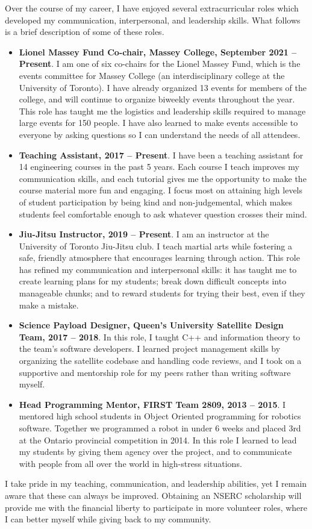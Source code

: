 \documentclass[a4paper,12pt]{article}
\begin{document}
Over the course of my career, I have enjoyed several extracurricular roles which
developed my communication, interpersonal, and leadership skills.
What follows is a brief description of some of these roles.
\begin{itemize}
\item \textbf{Lionel Massey Fund Co-chair, Massey College, September 2021 -- Present}.
    I am one of six co-chairs for the Lionel Massey Fund, which is the events
    committee for Massey College (an interdisciplinary college at the University
    of Toronto).
    I have already organized 13 events for members of the college, and will
    continue to organize biweekly events throughout the year.
    This role has taught me the logistics and leadership skills required to
    manage large events for 150 people.
    I have also learned to make events accessible to everyone by asking
    questions so I can understand the needs of all attendees.

\item \textbf{Teaching Assistant, 2017 -- Present}.
    I have been a teaching assistant for 14 engineering courses in the past 5 years.
    Each course I teach improves my communication skills, and each tutorial gives
    me the opportunity to make the course material more fun and engaging.
    I focus most on attaining high levels of student participation by being
    kind and non-judgemental, which makes students feel
    comfortable enough to ask whatever question crosses their mind. 

\item \textbf{Jiu-Jitsu Instructor, 2019 -- Present}. 
    I am an instructor at the University of Toronto Jiu-Jitsu club. I teach
    martial arts while fostering a safe, friendly atmosphere that
    encourages learning through action.
    This role has refined my communication and interpersonal skills:
    it has taught me to create learning plans for my students;
    break down difficult concepts into manageable chunks; 
    and to reward students for trying their best, even if they make a mistake.

\item \textbf{Science Payload Designer, Queen’s University Satellite Design
    Team, 2017 -- 2018}. 
    In this role, I taught C++ and information theory to the team’s software
    developers. I learned project management skills by organizing
    the satellite codebase and handling code reviews, and I took on a supportive
    and mentorship role for my peers rather than writing software myself.

\item \textbf{Head Programming Mentor, FIRST Team 2809, 2013 -- 2015}. 
    I mentored high school students in Object Oriented programming for robotics
    software. Together we programmed a robot in under 6 weeks and placed 3rd at
    the Ontario provincial competition in 2014.
    In this role I learned to lead my students by giving them agency over the
    project, and to communicate with people from all over the world in
    high-stress situations.

\end{itemize}

I take pride in my teaching, communication, and leadership abilities, yet I
remain aware that these can always be improved.
Obtaining an NSERC scholarship will provide me with the financial liberty to
participate in more volunteer roles, where I can better myself while giving back to my
community.
\end{document}
